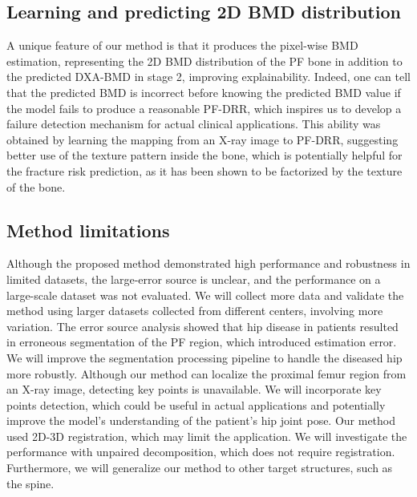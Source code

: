 \documentclass[times,twocolumn,final]{elsarticle}
\begin{document}
\subsection{Learning and predicting 2D BMD distribution}
A unique feature of our method is that it produces the pixel-wise BMD estimation, representing the 2D BMD distribution of the PF bone in addition to the predicted DXA-BMD in stage 2, improving explainability.
Indeed, one can tell that the predicted BMD is incorrect before knowing the predicted BMD value if the model fails to produce a reasonable PF-DRR, which inspires us to develop a failure detection mechanism for actual clinical applications. 
This ability was obtained by learning the mapping from an X-ray image to PF-DRR, suggesting better use of the texture pattern inside the bone, which is potentially helpful for the fracture risk prediction, as it has been shown to be factorized by the texture of the bone\citep{dong_random_2015,farzi_quantitating_2022}.

\subsection{Method limitations}
Although the proposed method demonstrated high performance and robustness in limited datasets, the large-error source is unclear, and the performance on a large-scale dataset was not evaluated.
We will collect more data and validate the method using larger datasets collected from different centers, involving more variation.
The error source analysis showed that hip disease in patients resulted in erroneous segmentation of the PF region, which introduced estimation error. We will improve the segmentation processing pipeline to handle the diseased hip more robustly.
Although our method can localize the proximal femur region from an X-ray image, detecting key points is unavailable. We will incorporate key points detection, which could be useful in actual applications and potentially improve the model’s understanding of the patient’s hip joint pose.
Our method used 2D-3D registration, which may limit the application.
We will investigate the performance with unpaired decomposition, which does not require registration.
Furthermore, we will generalize our method to other target structures, such as the spine.
\end{document}
